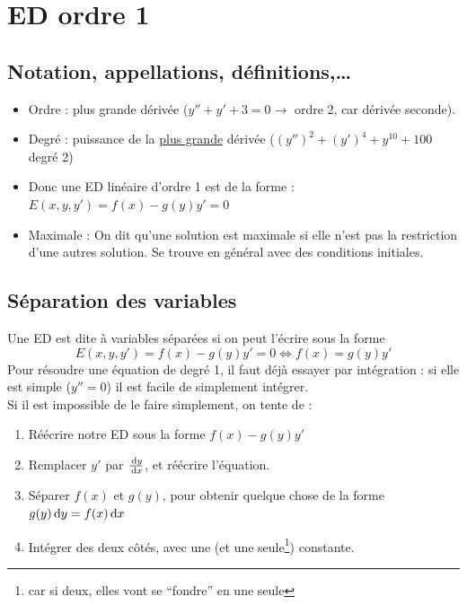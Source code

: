 \documentclass[12pt,a4paper]{article}
\renewcommand{\)}{\right)}
\renewcommand{\(}{\left(}
\begin{document}
\section{ED ordre 1}
\subsection{Notation, appellations, définitions,\ldots}
\begin{itemize}
	\item Ordre : plus grande dérivée ($y''+y'+3 = 0 \to$ ordre 2, car dérivée seconde).
	\item Degré : puissance de la \underline{plus grande} dérivée ($(y'')^{2} + (y')^{4} + y^{10} + 100$ degré 2)
	\item Donc une ED linéaire d'ordre 1 est de la forme : $E(x,y,y') = f(x) -g(y)y' = 0$
	\item Maximale : On dit qu'une solution est maximale si elle n'est pas la restriction d'une autres solution. Se trouve en général avec des conditions initiales.
\end{itemize}

\subsection{Séparation des variables}
Une ED est dite à variables séparées si on peut l'écrire sous la forme
\[E(x,y,y') = f(x) - g(y)y' = 0 \iff f(x) = g(y)y'\]
Pour résoudre une équation de degré 1, il faut déjà essayer par intégration : si elle est simple ($y''=0$) il est facile de simplement intégrer. \\
Si il est impossible de le faire simplement, on tente de :
\begin{enumerate}
	\item Réécrire notre ED sous la forme $f(x)-g(y)y'$
	\item Remplacer $y'$ par $\frac{\, \mathrm d y}{\, \mathrm d x}$, et réécrire l'équation.
	\item Séparer $f(x)$ et $g(y)$, pour obtenir quelque chose de la forme \\$g(y)\, \mathrm d y = f(x)\, \mathrm d x$
	\item Intégrer des deux côtés, avec une (et une seule\footnote{car si deux, elles vont se \enquote{fondre} en une seule}) constante.
\end{enumerate}
\end{document}
